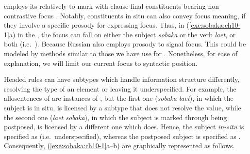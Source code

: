  employs its relatively  to mark
 with clause-final constituents bearing 
non-contrastive focus 
\citep{neeleman:titov:09}. Notably, constituents
in situ can also convey focus meaning, if they involve a
specific prosody for expressing focus. Thus, in
(\ref{exe:sobaka:ch10-1}a) in the , the focus
can fall on either the subject \textit{sobaka} or the verb
\textit{laet}, or both (i.e.\ ). Because Russian also
employs prosody to signal focus.  This could be modeled by methods
similar to those we have use for .  Nonetheless, for ease of
explanation, we will limit our current focus to syntactic
position.






Headed rules can have subtypes which handle information structure
differently, resolving the type of an  element or leaving
it underspecified. For example, the  allosentences of
 are instances of , but
the first one (\textit{sobaka laet}), in which the subject is
in situ, is licensed by a subtype that does not resolve the
 value, while the second one (\textit{laet
  sobaka}), in which the subject is marked
through being postposed, is licensed by a different one which
does. Hence, the subject \textit{in-situ} is specified as
 (i.e.\ underspecified), whereas the postposed subject
is specified as .  Consequently,
(\ref{exe:sobaka:ch10-1}a--b) are graphically represented as follows.




